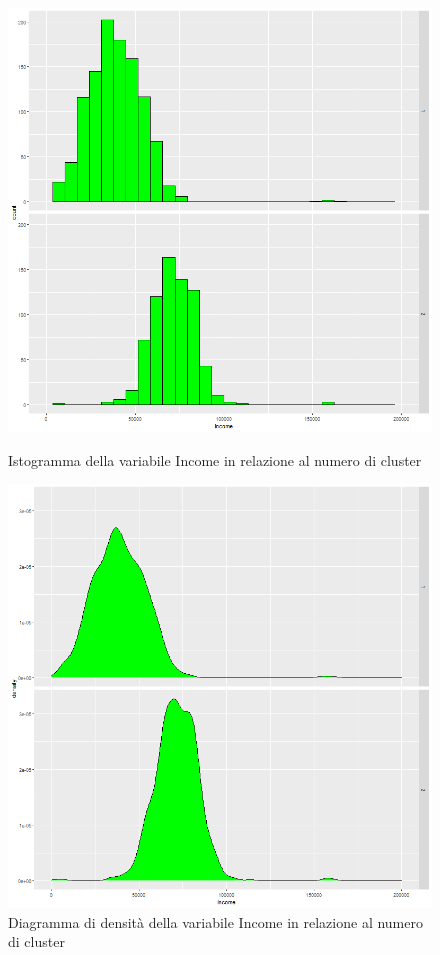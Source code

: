 \documentclass[letterpaper,11pt]{article}
\begin{document}
\begin{figure}[!htb]
   \begin{minipage}{0.48\textwidth}
     \centering
         \includegraphics[width=1\textwidth]{Img/K-MEANS/KMEANS010.png}
    \caption{Istogramma della variabile Income in relazione al numero di cluster}
    \label{fig:incomeKmeansHistogram}
   \end{minipage}\hfill
   \begin{minipage}{0.48\textwidth}
     \centering
     \includegraphics[width=1\linewidth]{Img/K-MEANS/KMEANS011.png}
     \caption{Diagramma di densità della variabile Income in relazione al numero di cluster}\label{fig:incomeKmeansDensity}
   \end{minipage}
\end{figure}
\end{document}
